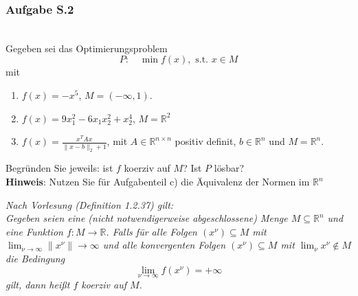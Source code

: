 \documentclass[12pt]{extreport} %
\newcommand{\R}{\mathbb{R}}
\theoremstyle{named}
\theoremstyle{nnamed}
\theoremstyle{itshape}
\theoremstyle{normal}
\begin{document}
\newpage

\subsubsection{Aufgabe S.2} ~\\
Gegeben sei das Optimierungsproblem
$$ P: \quad \min f(x), \text{ s.t. } x \in M $$
mit
\begin{enumerate}
	\item $f(x) = - x^5$, $M =(- \infty, 1)$.
	\item $f(x) = 9 x_1^2 - 6 x_1 x_2^2 + x_2^4$, $M = \R^2$
	\item $f(x) = \frac{x^T A x}{\| x - b\|_2 + 1}$, mit $A \in \R^{n \times n}$ positiv definit, $b \in \R^n$ und $M = \R^n$.
\end{enumerate}
	Begründen Sie jeweils: ist $f$ koerziv auf $M$? Ist $P$ lösbar? ~\\
	\textbf{Hinweis}: Nutzen Sie für Aufgabenteil c) die Äquivalenz der Normen im $\R^n$ ~\bigskip
	
	\textit{Nach Vorlesung (Definition 1.2.37) gilt:} ~\\
	\textit{Gegeben seien eine (nicht notwendigerweise abgeschlossene) Menge $M \subseteq \R^n$ und eine Funktion $f \colon M \rightarrow \R$. Falls für alle Folgen $(x^\nu) \subseteq M$ mit $\lim_{\nu \rightarrow \infty} \| x^\nu \| \rightarrow \infty$ und alle konvergenten Folgen $(x^\nu) \subseteq M$ mit $\lim_{\nu} x^\nu \notin M$ die Bedingung}
	$$ \lim_{\nu \rightarrow \infty} f(x^\nu) = + \infty $$
	\textit{gilt, dann heißt $f$ koerziv auf $M$.} ~\\
	
\end{document}
